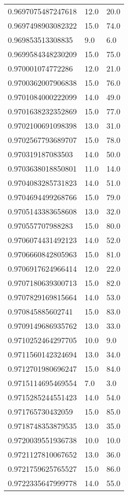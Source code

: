\begin{center}
\begin{supertabular}[H]{p{0.30\textwidth}p{0.05\textwidth}p{0.05\textwidth}}
0.9697075487247618 & 12.0 & 20.0 \\ 
0.9697498903082322 & 15.0 & 74.0 \\ 
0.969853513308835 & 9.0 & 6.0 \\ 
0.9699584348230209 & 15.0 & 75.0 \\ 
0.970001074772286 & 12.0 & 21.0 \\ 
0.9700362007906838 & 15.0 & 76.0 \\ 
0.9701084000222099 & 14.0 & 49.0 \\ 
0.9701638232352869 & 15.0 & 77.0 \\ 
0.9702100691098398 & 13.0 & 31.0 \\ 
0.9702567793689707 & 15.0 & 78.0 \\ 
0.970319187083503 & 14.0 & 50.0 \\ 
0.9703638018850801 & 11.0 & 14.0 \\ 
0.9704083285731823 & 14.0 & 51.0 \\ 
0.9704694499268766 & 15.0 & 79.0 \\ 
0.9705143383658608 & 13.0 & 32.0 \\ 
0.970557707988283 & 15.0 & 80.0 \\ 
0.9706074431492123 & 14.0 & 52.0 \\ 
0.9706660842805963 & 15.0 & 81.0 \\ 
0.9706917624966414 & 12.0 & 22.0 \\ 
0.9707180639300713 & 15.0 & 82.0 \\ 
0.9707829169815664 & 14.0 & 53.0 \\ 
0.970845885602741 & 15.0 & 83.0 \\ 
0.9709149686935762 & 13.0 & 33.0 \\ 
0.9710252464297705 & 10.0 & 9.0 \\ 
0.9711560142324694 & 13.0 & 34.0 \\ 
0.9712701980696247 & 15.0 & 84.0 \\ 
0.9715114695469554 & 7.0 & 3.0 \\ 
0.9715285244551423 & 14.0 & 54.0 \\ 
0.971765730432059 & 15.0 & 85.0 \\ 
0.9718748353879535 & 13.0 & 35.0 \\ 
0.9720039551936738 & 10.0 & 10.0 \\ 
0.9721127810067652 & 13.0 & 36.0 \\ 
0.9721759625765527 & 15.0 & 86.0 \\ 
0.9722335647999778 & 14.0 & 55.0 \\ 

\end{supertabular}
\end{center}
